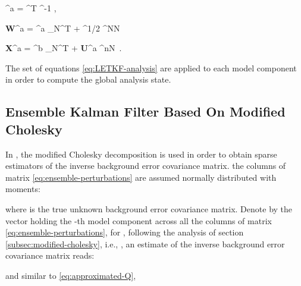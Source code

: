 \documentclass[12pt]{article}
\newcommand{\Nens}{N} \newcommand{\Nobs}{m} \newcommand{\Nstate}{n} \newcommand{\X}{{\bf X}} \newcommand{\x}{{\bf x}} \newcommand{\J}{\mathcal{J}} \newcommand{\lp}{\left (} \newcommand{\rp}{\right )} \newcommand{\lb}{\left [} \newcommand{\rb}{\right ]} \renewcommand{\ln}{\left \|} \newcommand{\rn}{\right \|}
\newcommand{\U}{{\bf U}}
\newcommand{\ones}{{\bf 1}}
\begin{document}
\displaystyle
\w^a =  \cdot \Z^T \cdot \R^{-1} \cdot \lb \y - \H \cdot \xm^b \rb,\,

\displaystyle
{\bf W}^a = \w^a \otimes \ones_{\Nens}^T + \lb (\Nens-1) \cdot \widehat{\P^a} \rb^{1/2} \in \Re^{\Nens \times \Nens}

\label{eq:analysis-LETKF}
\displaystyle
\X^a = \xm^b \otimes \ones_{\Nens}^{T} + \U {}^a \in \Re^{\Nstate \times \Nens} \,.

The set of equations \eqref{eq:LETKF-analysis} are applied to each model component in order to compute the global analysis state.

\subsection{Ensemble Kalman Filter Based On Modified Cholesky}
\label{sec:proposed-method}

In \cite{nino2016enkf-mc}, the modified Cholesky decomposition is used in order to obtain sparse estimators of the inverse background error covariance matrix. the columns of matrix \eqref{eq:ensemble-perturbations} are assumed normally distributed with moments:

where  is the true unknown background error covariance matrix. Denote by  the vector holding the -th model component across all the columns of matrix \eqref{eq:ensemble-perturbations}, for , following the analysis of section \ref{subsec:modified-cholesky}, i.e., , an estimate of the inverse background error covariance matrix reads:

and similar to \eqref{eq:approximated-Q}, 
\end{document}
